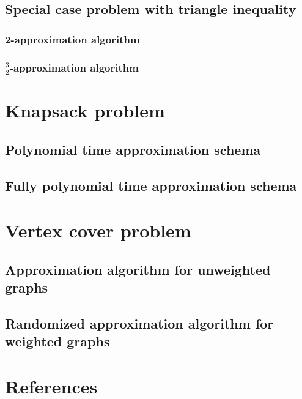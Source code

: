 \documentclass[a4paper]{article}
\begin{document}
   \subsection{Special case problem with triangle inequality}
   
   \subsubsection{2-approximation algorithm}
   
   \subsubsection{$\frac{3}{2}$-approximation algorithm}
   
   \section{Knapsack problem}
   
   \subsection{Polynomial time approximation schema}
   
   \subsection{Fully polynomial time approximation schema}
   
   \section{Vertex cover problem}
   
   \subsection{Approximation algorithm for unweighted graphs}
   
   \subsection{Randomized approximation algorithm for weighted graphs}
   
   
	\section*{References}
	\printbibliography[heading=none]
\end{document}

